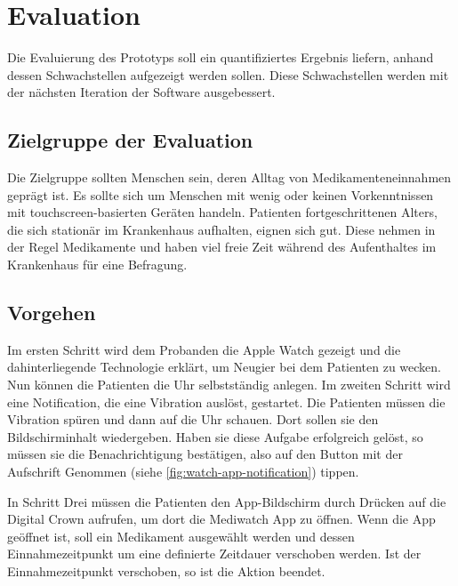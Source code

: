 
\section{Evaluation}

Die Evaluierung des Prototyps soll ein quantifiziertes Ergebnis liefern, anhand dessen Schwachstellen aufgezeigt werden sollen. Diese Schwachstellen werden mit der nächsten Iteration der Software ausgebessert.

\subsection{Zielgruppe der Evaluation}
Die Zielgruppe sollten Menschen sein, deren Alltag von Medikamenteneinnahmen geprägt ist. Es sollte sich um Menschen mit wenig oder keinen Vorkenntnissen mit touchscreen-basierten Geräten handeln.  Patienten fortgeschrittenen Alters, die sich stationär im Krankenhaus aufhalten, eignen sich gut. Diese nehmen in der Regel Medikamente und haben viel freie Zeit während des Aufenthaltes im Krankenhaus für eine Befragung.

\subsection{Vorgehen}
Im ersten Schritt wird dem Probanden die Apple Watch gezeigt und die dahinterliegende Technologie erklärt, um Neugier bei dem Patienten zu wecken. Nun können die Patienten die Uhr selbstständig anlegen. 
Im zweiten Schritt wird eine Notification, die eine Vibration auslöst, gestartet. Die Patienten müssen die Vibration spüren und dann auf die Uhr schauen. Dort sollen sie den Bildschirminhalt wiedergeben. Haben sie diese Aufgabe erfolgreich gelöst, so müssen sie die Benachrichtigung bestätigen, also auf den Button mit der Aufschrift \glqq Genommen \grqq (siehe \ref{fig:watch-app-notification}) tippen.

In Schritt Drei müssen die Patienten den App-Bildschirm durch Drücken auf die Digital Crown aufrufen, um dort die Mediwatch App zu öffnen. Wenn die App geöffnet ist, soll ein Medikament ausgewählt werden und dessen Einnahmezeitpunkt um eine definierte Zeitdauer verschoben werden. Ist der Einnahmezeitpunkt verschoben, so ist die Aktion beendet.

